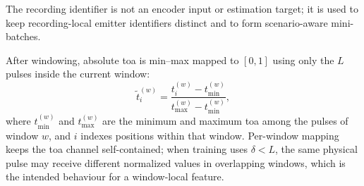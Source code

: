The recording identifier is not an encoder input or estimation target; it is used to keep recording-local emitter identifiers distinct and to form scenario-aware mini-batches.

After windowing, absolute \gls{toa} is min--max mapped to $[0,1]$ using only the $L$ pulses inside the current window:
\begin{equation}\label{eq:method:minmax}
  \tilde{t}^{(w)}_i
  =
  \frac{t^{(w)}_i - t^{(w)}_{\min}}{t^{(w)}_{\max} - t^{(w)}_{\min}},
\end{equation}
where $t^{(w)}_{\min}$ and $t^{(w)}_{\max}$ are the minimum and maximum \gls{toa} among the pulses of window $w$, and $i$ indexes positions within that window.
Per-window mapping keeps the \gls{toa} channel self-contained; when training uses $\delta < L$, the same physical pulse may receive different normalized values in overlapping windows, which is the intended behaviour for a window-local feature.
